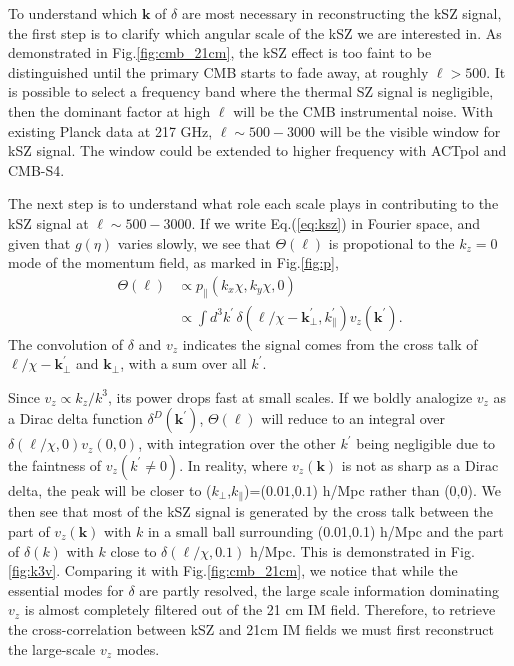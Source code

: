 
To understand which $\bm{k}$ of $\delta$ are most necessary in reconstructing the kSZ signal, the first step is to clarify which angular scale of the kSZ we are interested in. 
As demonstrated in Fig.\ref{fig:cmb_21cm}, the kSZ effect is too faint to be distinguished until the primary CMB starts to fade away, at roughly $\ell>500$. 
It is possible to select a frequency band where the thermal SZ signal is negligible, then the dominant factor at high $\ell$ will be the CMB instrumental noise.  With existing Planck \cite{Planck2015} data at 217 GHz, $\ell \sim 500-3000$ will be the visible window for kSZ signal. The window could be extended to higher frequency with ACTpol and CMB-S4. 

The next step is to understand what role each scale plays in contributing to the kSZ signal at $\ell \sim 500-3000$. If we write Eq.(\ref{eq:ksz}) in Fourier space, and given that $g(\eta)$ varies slowly, we see that $\Theta(\bm{\ell})$ is propotional to the $k_z=0$ mode of the momentum field, as marked in Fig.\ref{fig:p},
\begin{align}
    \label{eq:thetak}
    \Theta(\bm{\ell}) &\propto p_\parallel({k}_x\chi,{k}_y\chi,0)\\
     & \propto \int 
    d^3k^\prime\,\delta(\bm{\ell}/\chi-\bm{k}_\perp^\prime,k_\parallel^\prime) v_z(\bm{k^\prime})\nonumber.
    \end{align}
 The
convolution of $\delta$ and $v_z$ indicates the signal comes from the cross talk of $\bm{\ell}/\chi-\bm{k}_\perp^\prime$ and $\bm{k}_\perp$, with a sum over all $k^\prime$. 

Since $v_z \propto k_z/k^3$, its power drops fast at small scales.  If we boldly analogize  $v_z$ as a Dirac delta function $\delta^D(\bm{k}^\prime)$, $\Theta(\bm{\ell})$ will reduce to an integral over $\delta(\bm{\ell}/\chi,0) v_z(0,0)$, with integration over the other $k^\prime$ being negligible due to the faintness of $v_z(k^\prime\neq0)$. In reality, where $v_z(\bm{k})$ is not as sharp as a Dirac delta, the peak will be closer to ($k_\perp$,$k_\parallel$)=($0.01$,$0.1$) h/Mpc rather than (0,0). We then see  
that most of the kSZ signal is generated by the cross talk between the part of $v_z(\bm{k})$ with $k$ in a small ball surrounding (0.01,0.1) h/Mpc and the part of $\delta(k)$ with $k$ close to $\delta(\bm{\ell}/\chi,0.1)$ h/Mpc. This is demonstrated in Fig.\ref{fig:k3v}.
Comparing it with Fig.\ref{fig:cmb_21cm}, we notice that while the essential modes  for $\delta$ are partly resolved, the large scale information dominating $v_z$ is almost completely filtered out of the 21 cm IM field. Therefore, to retrieve the cross-correlation between kSZ and 21cm IM fields we must first reconstruct the large-scale $v_z$ modes.
